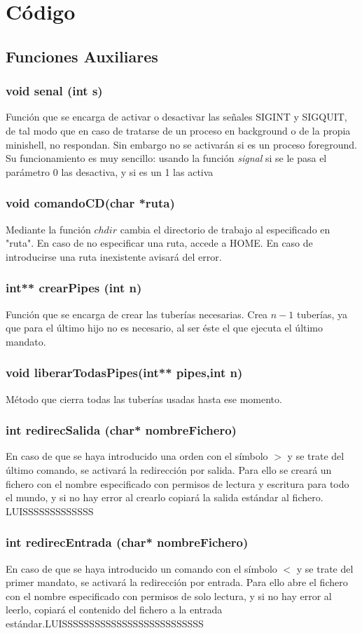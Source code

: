 \chapter{Código}
\section{Funciones Auxiliares}
\subsection{void senal (int s)}
Función que se encarga de activar o desactivar las señales SIGINT y SIGQUIT, de tal modo que en caso de tratarse de un proceso en background o de la propia minishell, no respondan. Sin embargo no se activarán si es un proceso foreground.\\
Su funcionamiento es muy sencillo: usando la función \textit{signal} si se le pasa el parámetro 0 las desactiva, y si es un 1 las activa
\subsection{void comandoCD(char *ruta)}
Mediante la función $chdir$ cambia el directorio de trabajo al especificado en "ruta". En caso de no especificar una ruta, accede a HOME. En caso de introducirse una ruta inexistente avisará del error.
\subsection{int** crearPipes (int n)}
Función que se encarga de crear las tuberías necesarias. Crea $n-1$ tuberías, ya que para el último hijo no es necesario, al ser éste el que ejecuta el último mandato.
\subsection{void liberarTodasPipes(int** pipes,int n)}
Método que cierra todas las tuberías usadas hasta ese momento.
\subsection{int redirecSalida (char* nombreFichero)}
En caso de que se haya introducido una orden con el símbolo $>$ y se trate del último comando, se activará la redirección por salida. Para ello se creará un fichero con el nombre especificado con permisos de lectura y escritura para todo el mundo, y si no hay error al crearlo copiará la salida estándar al fichero. LUISSSSSSSSSSSSS
\subsection{int redirecEntrada (char* nombreFichero)}
En caso de que se haya introducido un comando con el símbolo $<$ y se trate del primer mandato, se activará la redirección por entrada. Para ello abre el fichero con el nombre especificado con permisos de solo lectura, y si no hay error al leerlo, copiará el contenido del fichero a la entrada estándar.LUISSSSSSSSSSSSSSSSSSSSSSSSSS
